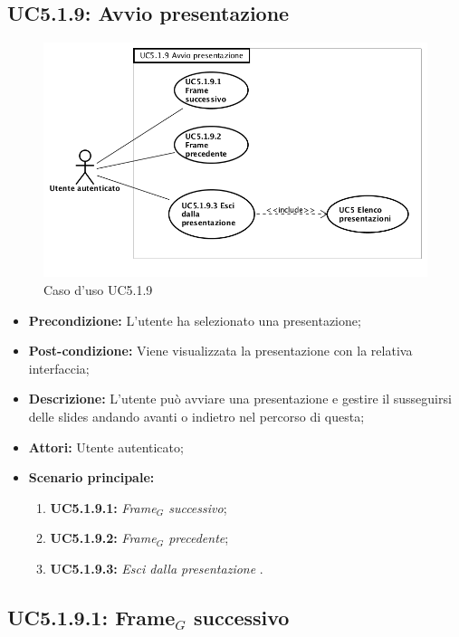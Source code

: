 \newpage
\subsection{ UC5.1.9: Avvio presentazione }

\begin{figure}[h]
	\begin{center}
	\includegraphics[scale=0.4]{diagram/UC5-1-9.png}
	\caption{Caso d'uso UC5.1.9}
	\end{center}
\end{figure}
\begin{itemize}
	\item \textbf{Precondizione:} L'utente ha selezionato una presentazione;
	\item \textbf{Post-condizione:} Viene visualizzata la presentazione con la relativa interfaccia;
	\item \textbf{Descrizione:} L'utente può avviare una presentazione e gestire il susseguirsi delle slides andando avanti o indietro nel percorso di questa;
	\item \textbf{Attori:} Utente autenticato;
	\item \textbf{Scenario principale:}
	\begin{enumerate}
		\item \textbf{ UC5.1.9.1:} \textit{ Frame$_G$ successivo};
		\item \textbf{ UC5.1.9.2:} \textit{ Frame$_G$ precedente};
		\item \textbf{ UC5.1.9.3:} \textit{ Esci dalla presentazione }.
	\end{enumerate}
\end{itemize}
\subsection{ UC5.1.9.1: Frame$_G$ successivo}


